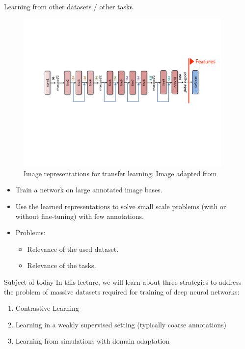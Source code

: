 \documentclass[xcolor=pdftex,dvipsnames,table]{beamer}
\begin{document}
\begin{frame}{Learning from other datasets / other tasks}
\begin{figure}[htb]
   \centering
   \includegraphics[width=0.95\textwidth]{../graphics/transfer_learning.pdf}
   \caption{Image representations for transfer learning. Image adapted from \cite{Iandola:2017}}
\end{figure}
\begin{itemize}
   \item Train a network on large annotated image bases.
   \item Use the learned representations to solve small scale problems (with or without fine-tuning) with few annotations.
   \item Problems:
   \begin{itemize}
   	\item Relevance of the used dataset.
   	\item Relevance of the tasks. 
   \end{itemize}
\end{itemize}
\end{frame}


\begin{frame}{Subject of today}
In this lecture, we will learn about three strategies to address the problem of massive datasets required for training of deep neural networks:
\begin{enumerate}
\item Contrastive Learning
\item Learning in a weakly supervised setting (typically coarse annotations)
\item Learning from simulations with domain adaptation
\end{enumerate}
\end{frame}
\end{document}
